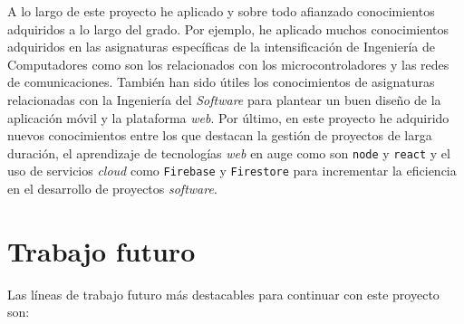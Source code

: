A lo largo de este proyecto he aplicado y sobre todo afianzado conocimientos adquiridos a lo largo del grado. Por ejemplo, he aplicado muchos conocimientos adquiridos en las asignaturas específicas de la intensificación de Ingeniería de Computadores como son los relacionados con los microcontroladores y las redes de comunicaciones. También han sido útiles los conocimientos de asignaturas relacionadas con la Ingeniería del \textit{Software} para plantear un buen diseño de la aplicación móvil y la plataforma \textit{web}. Por último, en este proyecto he adquirido nuevos conocimientos entre los que destacan la gestión de proyectos de larga duración, el aprendizaje de tecnologías \textit{web} en auge como son \texttt{node} y \texttt{react} y el uso de servicios \textit{cloud} como \texttt{Firebase} y \texttt{Firestore} para incrementar la eficiencia en el desarrollo de proyectos \textit{software}. 

\section{Trabajo futuro}

Las líneas de trabajo futuro más destacables para continuar con este proyecto son:

